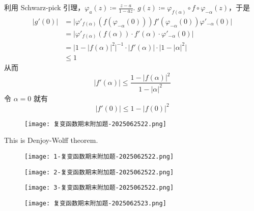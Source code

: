利用 Schwarz-pick 引理，$\varphi_{a}(z)\coloneqq\frac{z-a}{1-\overline{a}z}$. $g(z)\coloneqq\varphi_{f(\alpha)}\circ f\circ\varphi_{-\alpha}(z)$，于是
\[
\begin{aligned}
\lvert g'(0) \rvert &  =\lvert \varphi'_{f(\alpha)}(f(\varphi_{-\alpha}(0)))f'(\varphi_{-\alpha}(0))\varphi'_{-\alpha}(0) \rvert  \\
 & =\lvert \varphi'_{f(\alpha)}(f(\alpha))\cdot f'(\alpha)\cdot \varphi'_{-\alpha}(0)  \rvert \\
 & =\lvert 1-\lvert f(\alpha) \rvert ^{2}\rvert^{-1}   \cdot\lvert  f'(\alpha) \rvert \cdot\lvert 1-\lvert \alpha \rvert ^{2} \rvert  \\
 & \leq 1 
\end{aligned} 
\]
从而
\[
\lvert f'(\alpha) \rvert\leq \frac{1-\lvert f(\alpha) \rvert ^{2}}{1-\lvert \alpha \rvert ^{2}}
\]
令 $\alpha=0$ 就有
\[
\lvert f'(0) \rvert \leq 1-\lvert f(0) \rvert ^{2}
\]
\begin{figure}[H]
\centering
\texttt{[image: 复变函数期末附加题-2025062522.png]}
\label{}
\end{figure}

This is Denjoy-Wolff theorem.

\begin{exercise}
\begin{figure}[H]
\centering
\texttt{[image: 1-复变函数期末附加题-2025062522.png]}
\label{}
\end{figure}
\end{exercise}
\begin{figure}[H]
\centering
\texttt{[image: 2-复变函数期末附加题-2025062522.png]}
\label{}
\end{figure}
\begin{figure}[H]
\centering
\texttt{[image: 3-复变函数期末附加题-2025062522.png]}
\label{}
\end{figure}

\begin{figure}[H]
\centering
\texttt{[image: 复变函数期末附加题-2025062523.png]}
\label{}
\end{figure}

